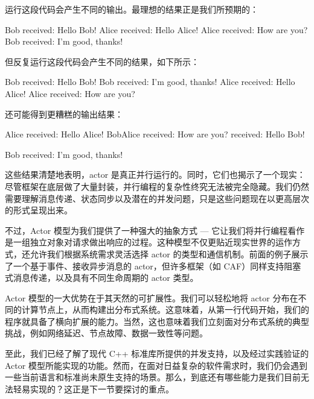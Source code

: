 运行这段代码会产生不同的输出。最理想的结果正是我们所预期的：

\begin{shell}
Bob received: Hello Bob!
Alice received: Hello Alice!
Alice received: How are you?
Bob received: I'm good, thanks!
\end{shell}

但反复运行这段代码会产生不同的结果，如下所示：

\begin{shell}
Bob received: Hello Bob!
Bob received: I'm good, thanks!
Alice received: Hello Alice!
Alice received: How are you?
\end{shell}

还可能得到更糟糕的输出结果：

\begin{shell}
Alice received: Hello Alice!
BobAlice received: How are you? received: Hello Bob!

Bob received: I'm good, thanks!
\end{shell}

这些结果清楚地表明，actor 是真正并行运行的。同时，它们也揭示了一个现实：尽管框架在底层做了大量封装，并行编程的复杂性终究无法被完全隐藏。我们仍然需要理解消息传递、状态同步以及潜在的并发问题，只是这些问题现在以更高层次的形式呈现出来。

不过，Actor 模型为我们提供了一种强大的抽象方式 --- 它让我们将并行编程看作是一组独立对象对请求做出响应的过程。这种模型不仅更贴近现实世界的运作方式，还允许我们根据系统需求灵活选择 actor 的类型和通信机制。前面的例子展示了一个基于事件、接收异步消息的 actor，但许多框架（如 CAF）同样支持阻塞式消息传递，以及具有不同生命周期的 actor 类型。

Actor 模型的一大优势在于其天然的可扩展性。我们可以轻松地将 actor 分布在不同的计算节点上，从而构建出分布式系统。这意味着，从第一行代码开始，我们的程序就具备了横向扩展的能力。当然，这也意味着我们立刻面对分布式系统的典型挑战，例如网络延迟、节点故障、数据一致性等问题。

至此，我们已经了解了现代 C++ 标准库所提供的并发支持，以及经过实践验证的 Actor 模型所能实现的功能。然而，在面对日益复杂的软件需求时，我们仍会遇到一些当前语言和标准尚未原生支持的场景。那么，到底还有哪些能力是我们目前无法轻易实现的？这正是下一节要探讨的重点。